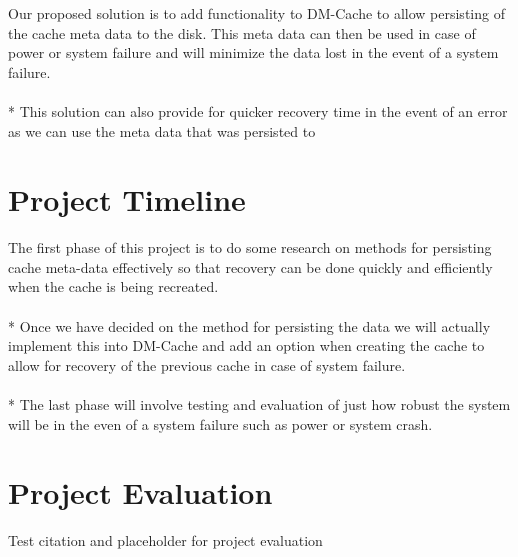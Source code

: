 \documentclass[letterpaper,12pt]{article}
\begin{document}
Our proposed solution is to add functionality to DM-Cache to allow
persisting of the cache meta data to the disk. This meta data can then
be used in case of power or system failure and will minimize the data
lost in the event of a system failure.
\\ \\*
%
This solution can also provide for quicker recovery time in the event
of an error as we can use the meta data that was persisted to


\section*{Project Timeline}

The first phase of this project is to do some research on methods for
persisting cache meta-data effectively so that recovery can be done
quickly and efficiently when the cache is being recreated.
\\ \\*
%
Once we have decided on the method for persisting the data we will
actually implement this into DM-Cache and add an option when creating
the cache to allow for recovery of the previous cache in case of
system failure.
\\ \\*
%
The last phase will involve testing and evaluation of just how robust
the system will be in the even of a system failure such as power or
system crash.


\section*{Project Evaluation}

Test citation and placeholder for project evaluation \cite{Test}





\end{document}
